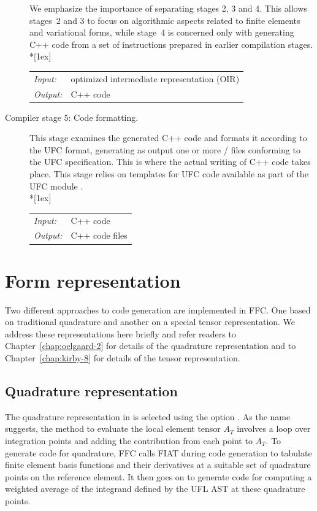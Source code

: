 \begin{description}
  We emphasize the importance of separating stages 2, 3 and 4. This
  allows stages~2 and 3 to focus on algorithmic aspects related to finite
  elements and variational forms, while stage~4 is concerned only with
  generating C++ code from a set of instructions prepared in earlier
  compilation stages. \\*[1ex]
  \begin{tabular}{ll}
    \emph{Input:}  & optimized intermediate representation (OIR) \\
    \emph{Output:} & C++ code
  \end{tabular}
\item[Compiler stage 5: Code formatting.]
  This stage examines the generated C++ code and formats it according to
  the UFC format, generating as output one or more / files
  conforming to the UFC specification. This is where the actual writing of C++
  code takes place. This stage relies on templates for UFC code
  available as part of the UFC module . \\*[1ex]
  \begin{tabular}{ll}
    \emph{Input:}  & C++ code \\
    \emph{Output:} & C++ code files
  \end{tabular}
\end{description}

\section{Form representation}
\label{sec:logg-1:representation}

Two different approaches to code generation are implemented in
FFC. One based on traditional quadrature and another on a special
tensor representation. We address these representations here briefly
and refer readers to Chapter~\ref{chap:oelgaard-2} for details of the quadrature
representation and to Chapter~\ref{chap:kirby-8} for details of the tensor
representation.

\subsection{Quadrature representation}

The quadrature representation in \ffc{} is selected using the
option .  As the name suggests, the method to
evaluate the local element tensor $A_T$ involves a loop over
integration points and adding the contribution from each point to
$A_T$. To generate code for quadrature, FFC calls FIAT during code
generation to tabulate finite element basis functions and their
derivatives at a suitable set of quadrature points on the reference
element. It then goes on to generate code for computing a weighted
average of the integrand defined by the UFL AST at these quadrature
points.

